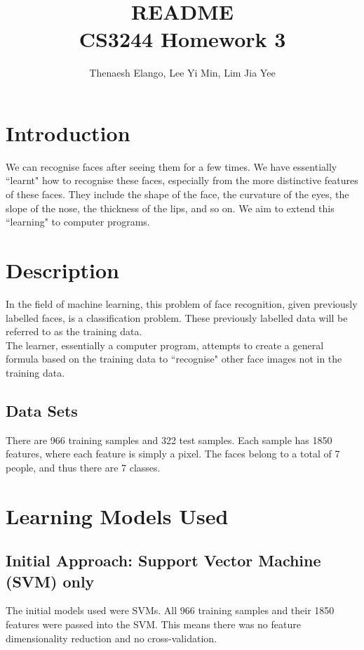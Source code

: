 \documentclass{article}
\title{README \\ CS3244 Homework 3}
\author{Thenaesh Elango, Lee Yi Min, Lim Jia Yee}
\begin{document}
\maketitle
\tableofcontents
\newpage

\section{Introduction}
We can recognise faces after seeing them for a few times. We have essentially ``learnt" how to recognise these faces, especially from the more distinctive features of these faces. They include the shape of the face, the curvature of the eyes, the slope of the nose, the thickness of the lips, and so on. We aim to extend this ``learning" to computer programs.

\section{Description}
In the field of machine learning, this problem of face recognition, given previously labelled faces, is a classification problem. These previously labelled data will be referred to as the training data. \\

The learner, essentially a computer program, attempts to create a general formula based on the training data to ``recognise" other face images not in the training data.

\subsection{Data Sets}
There are 966 training samples and 322 test samples. Each sample has 1850 features, where each feature is simply a pixel. The faces belong to a total of 7 people, and thus there are 7 classes.

\section{Learning Models Used}
\subsection{Initial Approach: Support Vector Machine (SVM) only}
The initial models used were SVMs. All 966 training samples and their 1850 features were passed into the SVM. This means there was no feature dimensionality reduction and no cross-validation. \\
\end{document}
